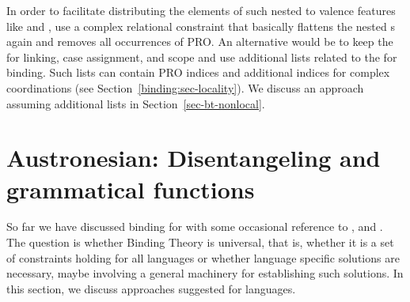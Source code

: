 \documentclass[output=paper
 	        ,biblatex
                ,babelshorthands
                ,newtxmath
                ,draftmode
                ,colorlinks, citecolor=brown
]{langscibook}
\begin{document}
In order to facilitate distributing the elements of such nested \argstls to valence features like
\subj and \comps, \citet[, 140]{MS98a} use a complex relational constraint that basically flattens the
nested \argst{}s again and removes all occurrences of PRO. An alternative would be to keep the
\argstl for linking, case assignment, and scope and use additional lists related to the \argstl for
binding. Such lists can contain PRO indices and additional indices for complex coordinations (see
Section~\ref{binding:sec-locality}). We discuss an approach assuming additional lists in Section~\ref{sec-bt-nonlocal}.



\section{Austronesian: Disentangeling \argst and grammatical functions}
\label{binding:toba-batak}

So far we have discussed binding for  with some occasional reference to ,
 and . The question is whether Binding Theory is universal, that is, whether it is a
set of constraints holding for all languages or whether language specific solutions are necessary,
maybe involving a general machinery for establishing such solutions. In this section, we discuss
approaches suggested for  languages.
\end{document}
